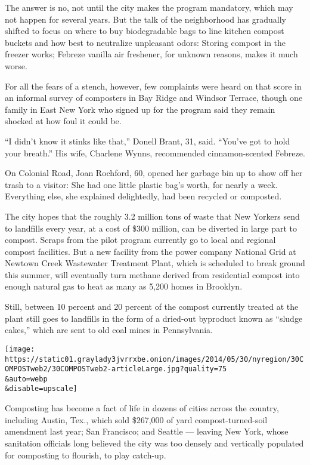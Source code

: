 The answer is no, not until the city makes the program mandatory, which
may not happen for several years. But the talk of the neighborhood has
gradually shifted to focus on where to buy biodegradable bags to line
kitchen compost buckets and how best to neutralize unpleasant odors:
Storing compost in the freezer works; Febreze vanilla air freshener, for
unknown reasons, makes it much worse.

For all the fears of a stench, however, few complaints were heard on
that score in an informal survey of composters in Bay Ridge and Windsor
Terrace, though one family in East New York who signed up for the
program said they remain shocked at how foul it could be.

``I didn't know it stinks like that,'' Donell Brant, 31, said. ``You've
got to hold your breath.'' His wife, Charlene Wynns, recommended
cinnamon-scented Febreze.

On Colonial Road, Joan Rochford, 60, opened her garbage bin up to show
off her trash to a visitor: She had one little plastic bag's worth, for
nearly a week. Everything else, she explained delightedly, had been
recycled or composted.

The city hopes that the roughly 3.2 million tons of waste that New
Yorkers send to landfills every year, at a cost of \$300 million, can be
diverted in large part to compost. Scraps from the pilot program
currently go to local and regional compost facilities. But a new
facility from the power company National Grid at Newtown Creek
Wastewater Treatment Plant, which is scheduled to break ground this
summer, will eventually turn methane derived from residential compost
into enough natural gas to heat as many as 5,200 homes in Brooklyn.

Still, between 10 percent and 20 percent of the compost currently
treated at the plant still goes to landfills in the form of a dried-out
byproduct known as ``sludge cakes,'' which are sent to old coal mines in
Pennsylvania.

\texttt{[image: https://static01.graylady3jvrrxbe.onion/images/2014/05/30/nyregion/30COMPOSTweb2/30COMPOSTweb2-articleLarge.jpg?quality=75\\\&auto=webp\\\&disable=upscale]}

Composting has become a fact of life in dozens of cities across the
country, including Austin, Tex., which sold \$267,000 of yard
compost-turned-soil amendment last year; San Francisco; and Seattle ---
leaving New York, whose sanitation officials long believed the city was
too densely and vertically populated for composting to flourish, to play
catch-up.


